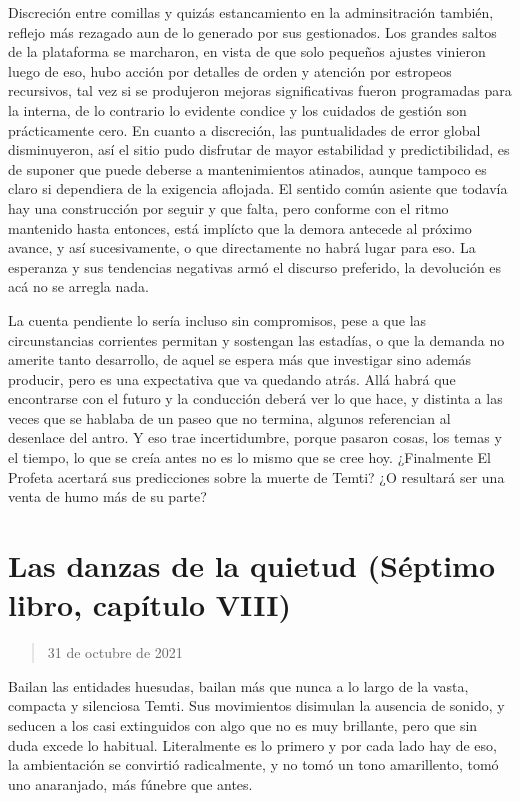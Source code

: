 \documentclass[
]{book}
\begin{document}
Discreción entre comillas y quizás estancamiento en la adminsitración también, reflejo más rezagado aun de lo generado por sus gestionados. Los grandes saltos de la plataforma se marcharon, en vista de que solo pequeños ajustes vinieron luego de eso, hubo acción por detalles de orden y atención por estropeos recursivos, tal vez si se produjeron mejoras significativas fueron programadas para la interna, de lo contrario lo evidente condice y los cuidados de gestión son prácticamente cero. En cuanto a discreción, las puntualidades de error global disminuyeron, así el sitio pudo disfrutar de mayor estabilidad y predictibilidad, es de suponer que puede deberse a mantenimientos atinados, aunque tampoco es claro si dependiera de la exigencia aflojada. El sentido común asiente que todavía hay una construcción por seguir y que falta, pero conforme con el ritmo mantenido hasta entonces, está implícto que la demora antecede al próximo avance, y así sucesivamente, o que directamente no habrá lugar para eso. La esperanza y sus tendencias negativas armó el discurso preferido, la devolución es acá no se arregla nada.

La cuenta pendiente lo sería incluso sin compromisos, pese a que las circunstancias corrientes permitan y sostengan las estadías, o que la demanda no amerite tanto desarrollo, de aquel se espera más que investigar sino además producir, pero es una expectativa que va quedando atrás. Allá habrá que encontrarse con el futuro y la conducción deberá ver lo que hace, y distinta a las veces que se hablaba de un paseo que no termina, algunos referencian al desenlace del antro. Y eso trae incertidumbre, porque pasaron cosas, los temas y el tiempo, lo que se creía antes no es lo mismo que se cree hoy. ¿Finalmente El Profeta acertará sus predicciones sobre la muerte de Temti? ¿O resultará ser una venta de humo más de su parte?

\hypertarget{las-danzas-de-la-quietud-suxe9ptimo-libro-capuxedtulo-viii}{%
\section{Las danzas de la quietud (Séptimo libro, capítulo VIII)}\label{las-danzas-de-la-quietud-suxe9ptimo-libro-capuxedtulo-viii}}

\begin{quote}
31 de octubre de 2021
\end{quote}

Bailan las entidades huesudas, bailan más que nunca a lo largo de la vasta, compacta y silenciosa Temti. Sus movimientos disimulan la ausencia de sonido, y seducen a los casi extinguidos con algo que no es muy brillante, pero que sin duda excede lo habitual. Literalmente es lo primero y por cada lado hay de eso, la ambientación se convirtió radicalmente, y no tomó un tono amarillento, tomó uno anaranjado, más fúnebre que antes.
\end{document}
